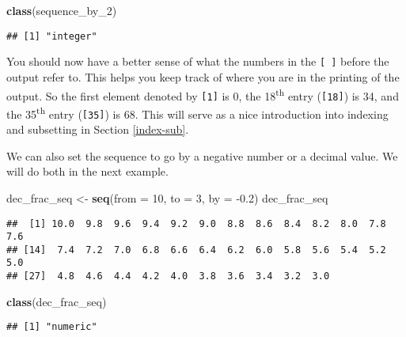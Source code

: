 \documentclass[]{tufte-book}
\newenvironment{Shaded}{\begin{snugshade}}{\end{snugshade}}
\newcommand{\DataTypeTok}[1]{\textcolor[rgb]{0.13,0.29,0.53}{#1}}
\newcommand{\DecValTok}[1]{\textcolor[rgb]{0.00,0.00,0.81}{#1}}
\newcommand{\FloatTok}[1]{\textcolor[rgb]{0.00,0.00,0.81}{#1}}
\newcommand{\KeywordTok}[1]{\textcolor[rgb]{0.13,0.29,0.53}{\textbf{#1}}}
\newcommand{\NormalTok}[1]{#1}
\newcommand{\StringTok}[1]{\textcolor[rgb]{0.31,0.60,0.02}{#1}}
\begin{document}
\begin{Shaded}
\begin{Highlighting}[]
\KeywordTok{class}\NormalTok{(sequence\_by\_}\DecValTok{2}\NormalTok{)}
\end{Highlighting}
\end{Shaded}

\begin{verbatim}
## [1] "integer"
\end{verbatim}

You should now have a better sense of what the numbers in the \texttt{{[}\ {]}} before the output refer to. This helps you keep track of where you are in the printing of the output. So the first element denoted by \texttt{{[}1{]}} is 0, the 18\textsuperscript{th} entry (\texttt{{[}18{]}}) is 34, and the 35\textsuperscript{th} entry (\texttt{{[}35{]}}) is 68. This will serve as a nice introduction into indexing and subsetting in Section \ref{index-sub}.

We can also set the sequence to go by a negative number or a decimal value. We will do both in the next example.

\begin{Shaded}
\begin{Highlighting}[]
\NormalTok{dec\_frac\_seq <{-}}\StringTok{ }\KeywordTok{seq}\NormalTok{(}\DataTypeTok{from =} \DecValTok{10}\NormalTok{, }\DataTypeTok{to =} \DecValTok{3}\NormalTok{, }\DataTypeTok{by =} \FloatTok{{-}0.2}\NormalTok{)}
\NormalTok{dec\_frac\_seq}
\end{Highlighting}
\end{Shaded}

\begin{verbatim}
##  [1] 10.0  9.8  9.6  9.4  9.2  9.0  8.8  8.6  8.4  8.2  8.0  7.8  7.6
## [14]  7.4  7.2  7.0  6.8  6.6  6.4  6.2  6.0  5.8  5.6  5.4  5.2  5.0
## [27]  4.8  4.6  4.4  4.2  4.0  3.8  3.6  3.4  3.2  3.0
\end{verbatim}

\begin{Shaded}
\begin{Highlighting}[]
\KeywordTok{class}\NormalTok{(dec\_frac\_seq)}
\end{Highlighting}
\end{Shaded}

\begin{verbatim}
## [1] "numeric"
\end{verbatim}

\vspace*{0.2in}
\end{document}
